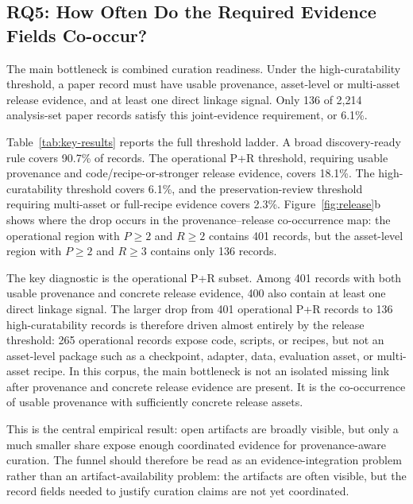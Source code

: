 \subsection{RQ5: How Often Do the Required Evidence Fields Co-occur?}

The main bottleneck is combined curation readiness. Under the high-curatability threshold, a paper record must have usable provenance, asset-level or multi-asset release evidence, and at least one direct linkage signal. Only 136 of 2,214 analysis-set paper records satisfy this joint-evidence requirement, or 6.1\%.

Table~\ref{tab:key-results} reports the full threshold ladder. A broad discovery-ready rule covers 90.7\% of records. The operational P+R threshold, requiring usable provenance and code/recipe-or-stronger release evidence, covers 18.1\%. The high-curatability threshold covers 6.1\%, and the preservation-review threshold requiring multi-asset or full-recipe evidence covers 2.3\%. Figure~\ref{fig:release}b shows where the drop occurs in the provenance--release co-occurrence map: the operational region with $P\geq2$ and $R\geq2$ contains 401 records, but the asset-level region with $P\geq2$ and $R\geq3$ contains only 136 records.

The key diagnostic is the operational P+R subset. Among 401 records with both usable provenance and concrete release evidence, 400 also contain at least one direct linkage signal. The larger drop from 401 operational P+R records to 136 high-curatability records is therefore driven almost entirely by the release threshold: 265 operational records expose code, scripts, or recipes, but not an asset-level package such as a checkpoint, adapter, data, evaluation asset, or multi-asset recipe. In this corpus, the main bottleneck is not an isolated missing link after provenance and concrete release evidence are present. It is the co-occurrence of usable provenance with sufficiently concrete release assets.

This is the central empirical result: open \llm artifacts are broadly visible, but only a much smaller share expose enough coordinated evidence for provenance-aware curation. The funnel should therefore be read as an evidence-integration problem rather than an artifact-availability problem: the artifacts are often visible, but the record fields needed to justify curation claims are not yet coordinated.
